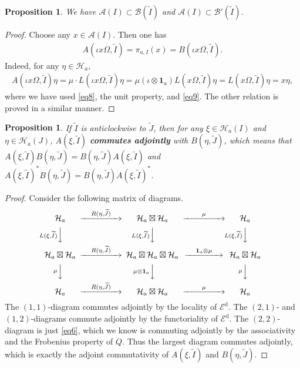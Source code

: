 \documentclass[12pt,a4paper]{article}
\theoremstyle{definition}
\theoremstyle{plain}
\newtheorem{pp}[df]{Proposition}
\newcommand{\mc}{\mathcal}
\newcommand{\wtd}{\widetilde}
\newcommand{\id}{\mathbf{1}}
\newcommand{\Ed}{\mathscr E^{\mathrm d}}
\numberwithin{equation}{section}
\begin{document}
\begin{pp}\label{lb4}
We have $\mc A(I)\subset\mc B(\wtd I)$ and $\mc A(I)\subset\mc B'(\wtd I)$.
\end{pp}
\begin{proof}
Choose any $x\in\mc A(I)$. Then one has
\begin{align}
A(\iota x\Omega,\wtd I)=\pi_{a,I}(x)=B(\iota x\Omega,\wtd I).
\end{align}
Indeed, for any $\eta\in\mc H_a$,
\begin{align*}
A(\iota x\Omega,\wtd I)\eta=\mu\cdot L(\iota x\Omega,\wtd I)\eta=\mu(\iota\otimes\id_a)L(x\Omega,\wtd I)\eta=L(x\Omega,\wtd I)\eta=x\eta,
\end{align*}
where we have used \eqref{eq8}, the unit property, and \eqref{eq9}. The other relation is proved in a similar manner.
\end{proof}

\begin{pp}
If $\wtd I$ is anticlockwise to $\wtd J$, then for any $\xi\in\mc H_a(I)$ and $\eta\in\mc H_a(J)$, $A(\xi,\wtd I)$ \textbf{commutes adjointly} with $B(\eta,\wtd J)$, which means that $A(\xi,\wtd I)B(\eta,\wtd J)=B(\eta,\wtd J)A(\xi,\wtd I)$ and $A(\xi,\wtd I)^*B(\eta,\wtd J)=B(\eta,\wtd J)A(\xi,\wtd I)^*$.
\end{pp}

\begin{proof}
Consider the following matrix of diagrams.
\begin{align}
\begin{CD}
\mc H_a @>\quad R(\eta,\wtd J) \quad >> \mc H_a\boxtimes\mc H_a @> ~~~\quad  \mu \quad~~~  >> \mc H_a\\
@V L(\xi,\wtd I)  VV @V L(\xi,\wtd I) VV @V L(\xi,\wtd I) VV\\
\mc H_a\boxtimes\mc H_a @> \quad  R(\eta,\wtd J) \quad  >> \mc H_a\boxtimes \mc H_a\boxtimes\mc H_a   @> \quad \id_a\otimes \mu\quad  >>\mc H_a\boxtimes\mc H_a\\
@V \mu  VV @V  \mu\otimes\id_a VV @V  \mu  VV\\
\mc H_a @> \quad  R(\eta,\wtd J) \quad  >> \mc H_a\boxtimes\mc H_a   @>~~~ \quad \mu \quad~~~  >>\mc H_a
\end{CD}
\end{align}
The $(1,1)$-diagram commutes adjointly by the locality of $\Ed$. The $(2,1)$- and $(1,2)$-diagrams commute adjointly by the functoriality of $\Ed$. The $(2,2)$-diagram is just  \eqref{eq6}, which we know is commuting adjointly by the associativity and the Frobenius property of $Q$. Thus the largest diagram commutes adjointly, which is exactly the adjoint commutativity of $A(\xi,\wtd I)$ and $B(\eta,\wtd J)$.
\end{proof}
\end{document}
